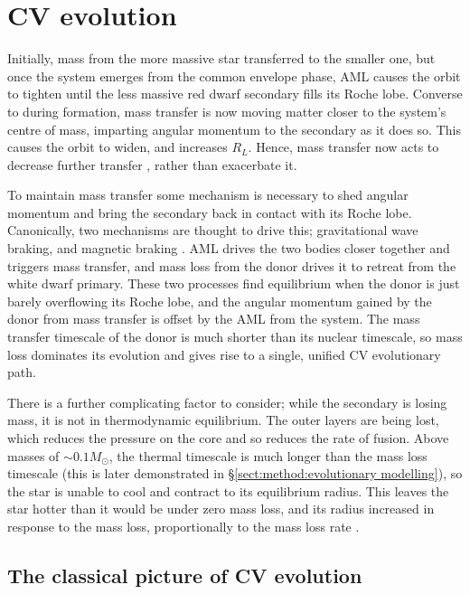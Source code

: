 \section{CV evolution}
\label{sect:introduction:Summary of how AML and Mdot drive period evolution}

Initially, mass from the more massive star transferred to the smaller one, but once the system emerges from the common envelope phase, AML causes the orbit to tighten until the less massive red dwarf secondary fills its Roche lobe. Converse to during formation, mass transfer is now moving matter closer to the system's centre of mass, imparting angular momentum to the secondary as it does so. This causes the orbit to widen, and increases $R_L$. Hence, mass transfer now acts to decrease further transfer \citep{Ritter2008}, rather than exacerbate it.

To maintain mass transfer some mechanism is necessary to shed angular momentum and bring the secondary back in contact with its Roche lobe. 
Canonically, two mechanisms are thought to drive this; gravitational wave braking, and magnetic braking \citep{knigge2006,knigge11}.
AML drives the two bodies closer together and triggers mass transfer, and mass loss from the donor drives it to retreat from the white dwarf primary. These two processes find equilibrium when the donor is just barely overflowing its Roche lobe, and the angular momentum gained by the donor from mass transfer is offset by the AML from the system.
The mass transfer timescale of the donor is much shorter than its nuclear timescale, so mass loss dominates its evolution and gives rise to a single, unified CV evolutionary path.

There is a further complicating factor to consider; while the secondary is losing mass, it is not in thermodynamic equilibrium. The outer layers are being lost, which reduces the pressure on the core and so reduces the rate of fusion. 
Above masses of $\sim 0.1 M_\odot$, the thermal timescale is much longer than the mass loss timescale (this is later demonstrated in \S\ref{sect:method:evolutionary modelling}), so the star is unable to cool and contract to its equilibrium radius. This leaves the star hotter than it would be under zero mass loss, and its radius increased in response to the mass loss, proportionally to the mass loss rate \citep{knigge2006, knigge11}.


\subsection{The classical picture of CV evolution}
\label{sect:introduction:AMLMechs}

